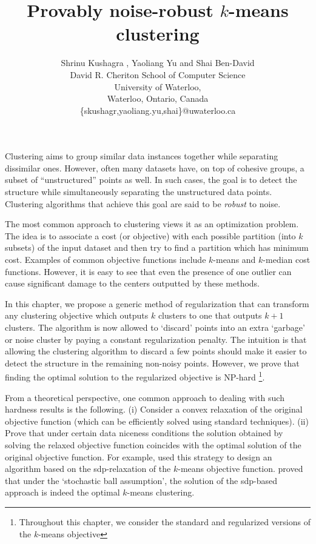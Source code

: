 \documentclass[12pt]{article}
\title{Provably noise-robust $k$-means clustering}
\author{\normalsize
{Shrinu Kushagra} {\textnormal {,}} {Yaoliang Yu} {\textnormal {and}} {Shai Ben-David} \\
\normalsize David R. Cheriton School of Computer Science \\
\normalsize University of Waterloo,\\
\normalsize Waterloo, Ontario, Canada\\
\normalsize \{skushagr,yaoliang.yu,shai\}@uwaterloo.ca \\
}
\begin{document}
\fi

Clustering aims to group similar data instances together while separating dissimilar ones. However, often many datasets have, on top of cohesive groups, a subset of ``unstructured'' points as well. In such cases, the goal is to detect the structure while simultaneously separating the unstructured data points. Clustering algorithms that achieve this goal are said to be {\em robust} to noise.

The most common approach to clustering views it as an optimization problem. The idea is to associate a cost (or objective) with each possible partition (into $k$ subsets) of the input dataset and then try to find a partition which has minimum cost. Examples of common objective functions include $k$-means and $k$-median cost functions. However, it is easy to see that even the presence of one outlier can cause significant damage to the centers outputted by these methods.

In this chapter, we propose a generic method of regularization that can transform any clustering objective which outputs $k$ clusters to one that outputs $k+1$ clusters. The algorithm is now allowed to `discard' points into an extra `garbage' or noise cluster by paying a constant regularization penalty. The intuition is that allowing the clustering algorithm to discard a few points should make it easier to detect the structure in the remaining non-noisy points. However, we prove that finding the optimal solution to the regularized objective is NP-hard \footnote{Throughout this chapter, we consider the standard and regularized versions of the $k$-means objective}. 

From a theoretical perspective, one common approach to dealing with such hardness results is the following. (i) Consider a convex relaxation of the original objective function (which can be efficiently solved using standard techniques). (ii) Prove that under certain data niceness conditions the solution obtained by solving the relaxed objective function coincides with the optimal solution of the original objective function. For example, \cite{peng2007approximating} used this strategy to design an algorithm based on the sdp-relaxation of the $k$-means objective function. \cite{awasthi2015relax} proved that under the `stochastic ball assumption', the solution of the sdp-based approach is indeed the optimal $k$-means clustering. 
\end{document}
